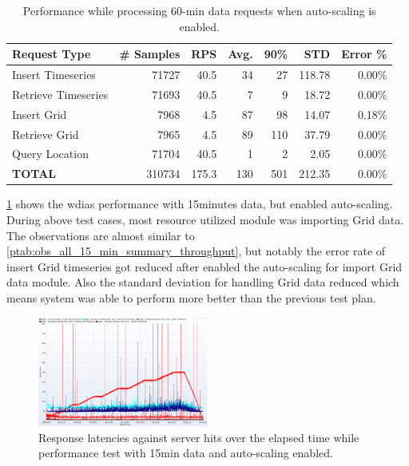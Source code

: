 \documentclass[conference]{IEEEtran}
\begin{document}
\begin{table}[tb!]
\caption{Performance while processing 60-min data requests when auto-scaling is enabled.}
\begin{center}
\begin{adjustbox}{width=0.45\textwidth}
\footnotesize
\begin{tabular}{|l|r|r|r|r|r|r|}
\hline
\textbf{Request Type} & \textbf{\# Samples} & \textbf{RPS} & \textbf{Avg.} & \textbf{90\%} & \textbf{STD} & \textbf{Error \%}\\ \hline
Insert Timeseries & 71727 & 40.5 & 34 & 27 & 118.78 & 0.00\% \\ \hline
Retrieve Timeseries & 71693 & 40.5 & 7 & 9 & 18.72 & 0.00\% \\ \hline
Insert Grid & 7968 & 4.5 & 87 & 98 & 14.07 & 0.18\% \\ \hline
Retrieve Grid & 7965 & 4.5 & 89 & 110 & 37.79 & 0.00\% \\ \hline
Query Location & 71704 & 40.5 & 1 & 2 & 2.05 & 0.00\% \\ \hline
\textbf{TOTAL} & 310734 & 175.3 & 130 & 501 & 212.35 & 0.00\% \\ \hline
\end{tabular}
\end{adjustbox}
\label{ptab:obs_all_auto_15_min_summary_throughput}
\end{center}
\end{table}

\cref{ptab:obs_all_auto_15_min_summary_throughput} shows the \acrshort{wdias} performance with 15minutes data, but enabled auto-scaling. During above test cases, most resource utilized module was importing Grid data.
The observations are almost similar to \cref{ptab:obs_all_15_min_summary_throughput}, but notably the error rate of insert Grid timeseries got reduced after enabled the auto-scaling for import Grid data module. Also the standard deviation for handling Grid data reduced which means system was able to perform more better than the previous test plan.

\begin{figure}[b!]
\centerline{\includegraphics[width=0.5\textwidth]{results/obs/all_auto/obs_all_auto_15m_res_latencies_against_hits.png}}
\caption{Response latencies against server hits over the elapsed time while performance test with 15min data and auto-scaling enabled.}
\label{pfi:test_obs_auto_all_15_min_latency_vs_hits}
\end{figure}
\end{document}

